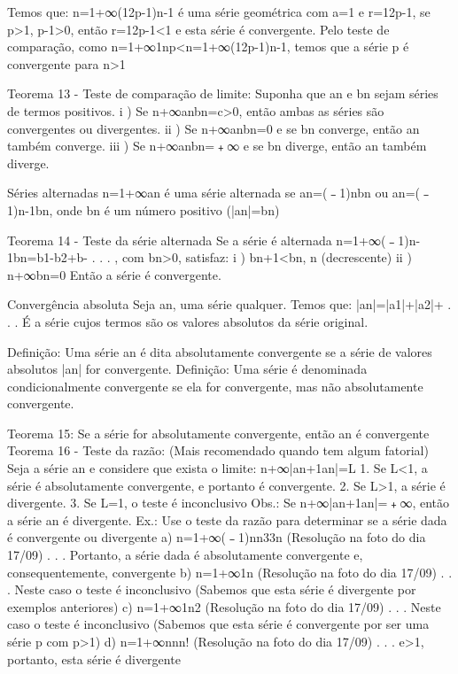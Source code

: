                 Temos que:
                    n=1+∞(12p-1)n-1 é uma série geométrica com a=1 e r=12p-1, se p>1, p-1>0, então r=12p-1<1 e esta série é convergente. 
                Pelo teste de comparação, como n=1+∞1np<n=1+∞(12p-1)n-1, temos que a série p é convergente para n>1

Teorema 13 - Teste de comparação de limite:
    Suponha que an e bn sejam séries de termos positivos.
        i ) Se n+∞anbn=c>0, então ambas as séries são convergentes ou divergentes.
        ii ) Se n+∞anbn=0 e se bn converge, então an também converge.
        iii ) Se n+∞anbn=﹢∞ e se bn diverge, então an também diverge.

Séries alternadas
    n=1+∞an é uma série alternada se an=(﹣1)nbn ou an=(﹣1)n-1bn, onde bn é um número positivo (|an|=bn)



Teorema 14 - Teste da série alternada
    Se a série é alternada n=1+∞(﹣1)n-1bn=b1-b2+b- . . . , com bn>0, satisfaz:
        i ) bn+1<bn, n (decrescente)
        ii ) n+∞bn=0
    Então a série é convergente.

Convergência absoluta
    Seja an, uma série qualquer. Temos que:
        |an|=|a1|+|a2|+ . . .
    É a série cujos termos são os valores absolutos da série original.

    Definição:
        Uma série an é dita absolutamente convergente se a série de valores absolutos |an| for convergente.
    Definição:
         Uma série é denominada condicionalmente convergente se ela for convergente, mas não absolutamente convergente.

Teorema 15:
    Se a série for absolutamente convergente, então an é convergente
Teorema 16 - Teste da razão:        (Mais recomendado quando tem algum fatorial)
    Seja a série an e considere que exista o limite:
        n+∞|an+1an|=L
    1. Se L<1, a série é absolutamente convergente, e portanto é convergente.
    2. Se L>1, a série é divergente.
    3. Se L=1, o teste é inconclusivo
    Obs.: Se n+∞|an+1an|=﹢∞, então a série an é divergente.
    Ex.: Use o teste da razão para determinar se a série dada é convergente ou divergente
            a) n=1+∞(﹣1)nn33n
                 (Resolução na foto do dia 17/09)
                 . . . Portanto, a série dada é absolutamente convergente e, consequentemente, convergente
            b) n=1+∞1n
                (Resolução na foto do dia 17/09)
                . . . Neste caso o teste é inconclusivo (Sabemos que esta série é divergente por exemplos anteriores)
            c) n=1+∞1n2
                (Resolução na foto do dia 17/09)
                . . . Neste caso o teste é inconclusivo (Sabemos que esta série é convergente por ser uma série p com p>1)
            d) n=1+∞nnn!
                (Resolução na foto do dia 17/09)
                . . . e>1, portanto, esta série é divergente

